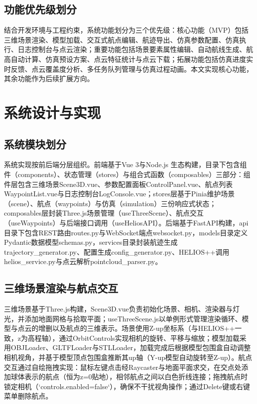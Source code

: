 \documentclass[a4paper,fleqn]{cas-sc}
\begin{document}
\subsection{功能优先级划分}
结合开发环境与工程约束，系统功能划分为三个优先级：核心功能（MVP）包括三维场景渲染、模型加载、交互式航点编辑、航迹导出、仿真参数配置、仿真执行、日志控制台与点云渲染；重要功能包括场景要素属性编辑、自动航线生成、航高自动计算、仿真预设方案、点云特征统计与点云下载；拓展功能包括仿真进度实时反馈、点云覆盖度分析、多任务队列管理与仿真过程动画。本文实现核心功能，其余功能作为后续扩展方向。

\section{系统设计与实现}\label{sec:impl}

\subsection{系统模块划分}
系统实现按前后端分层组织。前端基于Vue 3与Node.js \citep{nodejs} 生态构建，目录下包含组件（components）、状态管理（stores）与组合式函数（composables）三部分：组件层包含三维场景Scene3D.vue、参数配置面板ControlPanel.vue、航点列表WaypointList.vue与日志控制台LogConsole.vue；stores层基于Pinia维护场景（scene）、航点（waypoints）与仿真（simulation）三份响应式状态；composables层封装Three.js场景管理（useThreeScene）、航点交互（useWaypoints）与后端接口调用（useHeliosAPI）。后端基于FastAPI构建，api目录下包含REST路由routes.py与WebSocket端点websocket.py，models目录定义Pydantic数据模型schemas.py，services目录封装航迹生成trajectory\_generator.py、配置生成config\_generator.py、HELIOS++调用helios\_service.py与点云解析pointcloud\_parser.py。

\subsection{三维场景渲染与航点交互}
三维场景基于Three.js构建，Scene3D.vue负责初始化场景、相机、渲染器与灯光，并添加地面网格与拾取平面；useThreeScene.js以单例形式管理渲染循环、模型与点云的增删以及航点的三维表示。场景使用Z-up坐标系（与HELIOS++一致，z为高程轴），通过OrbitControls实现相机的旋转、平移与缩放；模型加载采用OBJLoader、GLTFLoader与STLLoader，加载完成后根据模型包围盒自动调整相机视角，并基于模型顶点包围盒推断其up轴（Y-up模型自动旋转至Z-up）。航点交互通过自绘拖拽实现：鼠标左键点击经Raycaster与地面平面求交，在交点处添加球体表示的航点（恒为z=0贴地），相邻航点之间以白色折线连接；拖拽航点时锁定相机（`controls.enabled=false`），确保不干扰视角操作；通过Delete键或右键菜单删除航点。
\end{document}
